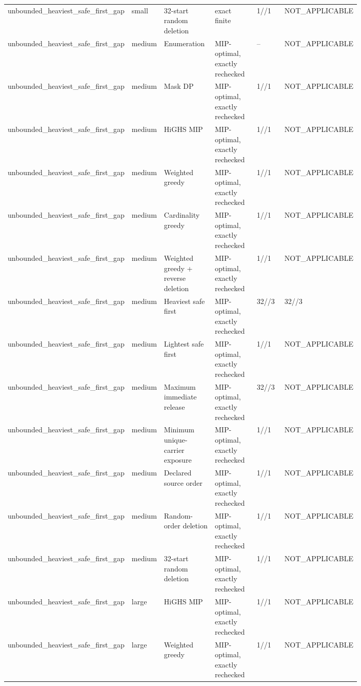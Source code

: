 {\begin{longtable}{p{0.18\linewidth}p{0.07\linewidth}p{0.17\linewidth}p{0.16\linewidth}p{0.10\linewidth}p{0.12\linewidth}}
unbounded\_heaviest\_safe\_first\_gap & small & 32-start random deletion & exact finite & 1//1 & NOT\_APPLICABLE \\
unbounded\_heaviest\_safe\_first\_gap & medium & Enumeration & MIP-optimal, exactly rechecked & -- & NOT\_APPLICABLE \\
unbounded\_heaviest\_safe\_first\_gap & medium & Mask DP & MIP-optimal, exactly rechecked & 1//1 & NOT\_APPLICABLE \\
unbounded\_heaviest\_safe\_first\_gap & medium & HiGHS MIP & MIP-optimal, exactly rechecked & 1//1 & NOT\_APPLICABLE \\
unbounded\_heaviest\_safe\_first\_gap & medium & Weighted greedy & MIP-optimal, exactly rechecked & 1//1 & NOT\_APPLICABLE \\
unbounded\_heaviest\_safe\_first\_gap & medium & Cardinality greedy & MIP-optimal, exactly rechecked & 1//1 & NOT\_APPLICABLE \\
unbounded\_heaviest\_safe\_first\_gap & medium & Weighted greedy + reverse deletion & MIP-optimal, exactly rechecked & 1//1 & NOT\_APPLICABLE \\
unbounded\_heaviest\_safe\_first\_gap & medium & Heaviest safe first & MIP-optimal, exactly rechecked & 32//3 & 32//3 \\
unbounded\_heaviest\_safe\_first\_gap & medium & Lightest safe first & MIP-optimal, exactly rechecked & 1//1 & NOT\_APPLICABLE \\
unbounded\_heaviest\_safe\_first\_gap & medium & Maximum immediate release & MIP-optimal, exactly rechecked & 32//3 & NOT\_APPLICABLE \\
unbounded\_heaviest\_safe\_first\_gap & medium & Minimum unique-carrier exposure & MIP-optimal, exactly rechecked & 1//1 & NOT\_APPLICABLE \\
unbounded\_heaviest\_safe\_first\_gap & medium & Declared source order & MIP-optimal, exactly rechecked & 1//1 & NOT\_APPLICABLE \\
unbounded\_heaviest\_safe\_first\_gap & medium & Random-order deletion & MIP-optimal, exactly rechecked & 1//1 & NOT\_APPLICABLE \\
unbounded\_heaviest\_safe\_first\_gap & medium & 32-start random deletion & MIP-optimal, exactly rechecked & 1//1 & NOT\_APPLICABLE \\
unbounded\_heaviest\_safe\_first\_gap & large & HiGHS MIP & MIP-optimal, exactly rechecked & 1//1 & NOT\_APPLICABLE \\
unbounded\_heaviest\_safe\_first\_gap & large & Weighted greedy & MIP-optimal, exactly rechecked & 1//1 & NOT\_APPLICABLE \\

\end{longtable}}
